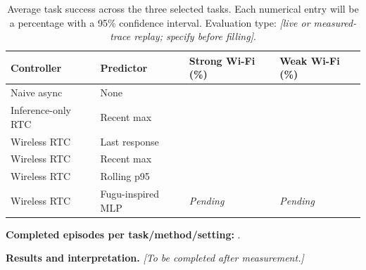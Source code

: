 \documentclass[11pt]{article}
\newcommand{\numplaceholder}{\textemdash}
\newcommand{\resultplaceholder}{\textit{[To be completed after measurement.]}}
\newcommand{\pending}{\textit{Pending}}
\begin{document}
\begin{table}[htbp]
\centering
\caption{Average task success across the three selected tasks. Each numerical entry will be a percentage with a 95\% confidence interval. Evaluation type: \textit{[live or measured-trace replay; specify before filling]}.}
\label{tab:success}
\small
\begin{tabularx}{\linewidth}{Xlll}
\toprule
Controller & Predictor & Strong Wi-Fi (\%) & Weak Wi-Fi (\%)\\
\midrule
Naive async & None & \numplaceholder & \numplaceholder\\
Inference-only RTC & Recent max & \numplaceholder & \numplaceholder\\
Wireless RTC & Last response & \numplaceholder & \numplaceholder\\
Wireless RTC & Recent max & \numplaceholder & \numplaceholder\\
Wireless RTC & Rolling p95 & \numplaceholder & \numplaceholder\\
Wireless RTC & Fugu-inspired MLP & \pending & \pending\\
\bottomrule
\end{tabularx}
\end{table}
\textbf{Completed episodes per task/method/setting:} \numplaceholder.
\par\textbf{Results and interpretation.} \resultplaceholder
\end{document}
